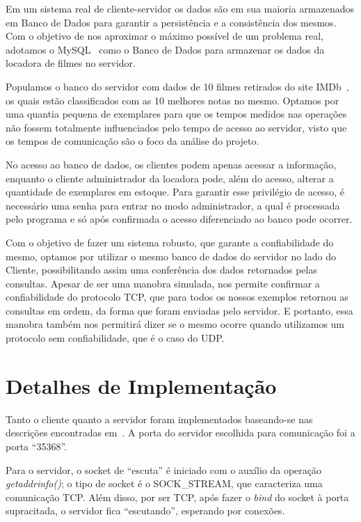 \documentclass[12pt,a4paper]{article}
\begin{document}
Em um sistema real de cliente-servidor os dados são em sua maioria armazenados em Banco de Dados para garantir a persistência e a consistência dos mesmos. Com o objetivo de nos aproximar o máximo possível de um problema real, adotamos o MySQL~\cite{mysql1995mysql} como o Banco de Dados para armazenar os dados da locadora de filmes no servidor.

    Populamos o banco do servidor com dados de 10 filmes retirados do site IMDb~\cite{IMDbsite}, os quais estão classificados com as 10 melhores notas no mesmo. Optamos por uma quantia pequena de exemplares para que os tempos medidos nas operações não fossem totalmente influenciados pelo tempo de acesso ao servidor, visto que os tempos de comunicação são o foco da análise do projeto.
    
    No acesso ao banco de dados, os clientes podem apenas acessar a informação, enquanto o cliente administrador da locadora pode, além do acesso, alterar a quantidade de exemplares em estoque. Para garantir esse privilégio de acesso, é necessário uma senha para entrar no modo administrador, a qual é processada pelo programa e só após confirmada o acesso diferenciado ao banco pode ocorrer.
    
Com o objetivo de fazer um sistema robusto, que garante a confiabilidade do mesmo, optamos por utilizar o mesmo banco de dados do servidor no lado do Cliente, possibilitando assim uma conferência dos dados retornados pelas consultas. Apesar de ser uma manobra simulada, nos permite confirmar a confiabilidade do protocolo TCP, que para todos os nossos exemplos retornou as consultas em ordem, da forma que foram enviadas pelo servidor. E portanto, essa manobra também nos permitirá dizer se o mesmo ocorre quando utilizamos um protocolo sem confiabilidade, que é o caso do UDP.

\section{Detalhes de Implementação}

Tanto o cliente quanto a servidor foram implementados baseando-se nas descrições encontradas em~\cite{hall19beej}. A porta do servidor escolhida para comunicação foi a porta “35368”.

Para o servidor, o socket de “escuta” é iniciado com o auxílio da operação {\it getaddrinfo()}; o tipo de socket é o SOCK\_STREAM, que caracteriza uma comunicação TCP. Além disso, por ser TCP, após fazer o {\it bind} do socket à porta supracitada, o servidor fica “escutando”, esperando por conexões.
\end{document}
